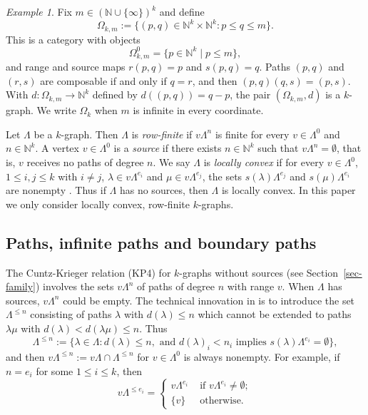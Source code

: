 \documentclass[a4paper,12pt]{amsart}
\numberwithin{equation}{section}
\theoremstyle{definition}
\theoremstyle{remark}
\newtheorem{ex}[thm]{Example}
\begin{document}
\begin{ex}
Fix   $m \in ({\mathbb{N}} \cup \{\infty\})^k$ and define 
 \[\Omega_{k,m}:= \{(p,q) \in {\mathbb{N}}^k \times {\mathbb{N}}^k :  p \leq q \leq m \}.
 \]
This is a category with objects
\[\Omega_{k,m}^0 =\{p \in {\mathbb{N}}^k \mid p \leq m\},\] 
and range and source maps $r(p,q)= p$ and $s(p,q) =q$.
Paths $(p,q)$ and $(r,s)$ are
composable if and only if $q=r$, and then $(p,q)(q,s) = (p,s)$.
With
$d:\Omega_{k,m} \to {\mathbb{N}}^k$ defined by $d((p,q)) = q-p$, the pair $(\Omega_{k,m}, d)$
is  a $k$-graph.  
We  write  $\Omega_k$ when  $m$ is infinite in every coordinate.
\end{ex}

Let $\Lambda$ be a $k$-graph.  
Then $\Lambda$ is \emph{row-finite} if $v\Lambda^n$ is finite for every $v\in\Lambda^0$ and $n\in{\mathbb{N}}^k$.   
A vertex $v\in\Lambda^0$ is a \emph{source} if there exists $n\in{\mathbb{N}}^k$ such that $v\Lambda^n=\emptyset$, 
that is, $v$ receives no paths of degree $n$.    We say  $\Lambda$ is \emph{locally convex}\label{lc} if for every $v\in \Lambda^0$, $1 \leq i,j \leq k$ with $i \neq j$,  $ \lambda \in v\Lambda^{e_i}$ and $\mu \in v\Lambda^{e_j}$, the sets
$s(\lambda)\Lambda^{e_j}$ and $s(\mu)\Lambda^{e_i}$ are nonempty \cite[Definition~3.10]{RSY03}.
Thus if $\Lambda$ has no sources, then $\Lambda$ is locally convex.  In this paper we only consider locally convex, row-finite $k$-graphs.

\subsection*{Paths, infinite paths and boundary paths}    
 The Cuntz-Krieger relation (KP4) for $k$-graphs without sources (see Section~\ref{sec-family}) involves the 
sets $v\Lambda^n$ of paths of degree $n$ with 
range $v$. When $\Lambda$ has sources, $v\Lambda^n$ could be empty.  The technical innovation in \cite{RSY03}
 is to introduce the set $\Lambda^{\leq n}$ consisting of paths $\lambda$ with $d(\lambda)\leq n$ which cannot be extended to paths $\lambda\mu$ with $d(\lambda)<d(\lambda\mu)\leq n$. Thus
\begin{equation*}
\Lambda^{\leq n}:=\{\lambda\in\Lambda: d(\lambda)\leq n, \text{\ and\ }d(\lambda)_i<n_i \text{\ implies\ }s(\lambda)\Lambda^{e_i}=\emptyset\},
\end{equation*}
 and then  $v\Lambda^{\leq n} := v\Lambda \cap \Lambda^{\leq n}$ for $v \in \Lambda^0$
is always nonempty.
For example, if $n=e_i$ for some $1\leq i \leq k$, then 
\[
v\Lambda^{\leq e_i} = \begin{cases} v\Lambda^{e_i} & \text{ if }v\Lambda^{e_i} \neq \emptyset;\\
 \{v\} & \text{ otherwise.}\end{cases}
\]
\end{document}
